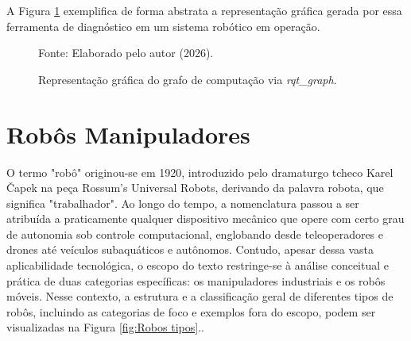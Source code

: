 A Figura \ref{fig:rqt_graph} exemplifica de forma abstrata a representação gráfica gerada por essa ferramenta de diagnóstico em um sistema robótico em operação.

\begin{figure}[htbp]
    \centering
    \caption{Representação gráfica do grafo de computação via \textit{rqt\_graph}.}
    \label{fig:rqt_graph}
    \vspace{1cm} %
    
    
    \begin{center}
    \end{center}
    
    \vspace{0.3cm}
    \small Fonte: Elaborado pelo autor (2026).
\end{figure}

\section{Robôs Manipuladores}%
O termo "robô"  originou-se em 1920, introduzido pelo dramaturgo tcheco Karel Čapek na peça Rossum's Universal Robots, derivando da palavra robota, que significa "trabalhador". Ao longo do tempo, a nomenclatura passou a ser atribuída a praticamente qualquer dispositivo mecânico que opere com certo grau de autonomia sob controle computacional, englobando desde teleoperadores e drones até veículos subaquáticos e autônomos. Contudo, apesar dessa vasta aplicabilidade tecnológica, o escopo do texto restringe-se à análise conceitual e prática de duas categorias específicas: os manipuladores industriais e os robôs móveis. Nesse contexto, a estrutura e a classificação geral de diferentes tipos de robôs, incluindo as categorias de foco e exemplos fora do escopo, podem ser visualizadas na Figura \ref{fig:Robos tipos}.\cite{spong2005robot}.

